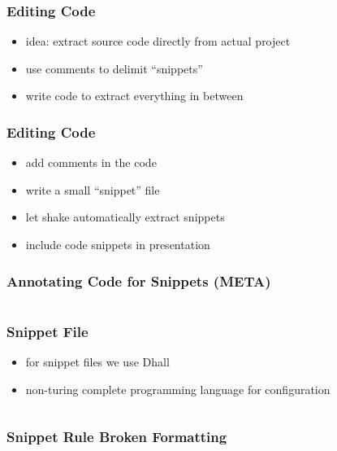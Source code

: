 \documentclass{beamer}
\begin{document}
\begin{frame}
  \frametitle{Editing Code}
  \begin{itemize}
  \item idea: extract source code directly from actual project
  \item use comments to delimit ``snippets''
  \item write code to extract everything in between
  \end{itemize}
\end{frame}

\begin{frame}
  \frametitle{Editing Code}
  \begin{itemize}
  \item add comments in the code
  \item write a small ``snippet'' file
  \item let shake automatically extract snippets
  \item include code snippets in presentation
  \end{itemize}
\end{frame}

\begin{frame}
  \frametitle{Annotating Code for Snippets (META)}
  \begin{center}
    \inputminted[autogobble]{haskell}{snippets/outer-pdf-rule.hs}
  \end{center}
\end{frame}

\begin{frame}
  \frametitle{Snippet File}
  \begin{itemize}
  \item for snippet files we use Dhall
  \item non-turing complete programming language for configuration
  \end{itemize}
  \begin{center}
    \inputminted{text}{snippets/pdf-rule.snippet}
  \end{center}
\end{frame}

\begin{frame}
  \frametitle{Snippet Rule \textemdash{} Broken Formatting}
  \begin{center}
    \inputminted[autogobble]{haskell}{snippets/outer-haskell-snippet-rule.hs_noformat}
  \end{center}
\end{frame}
\end{document}
